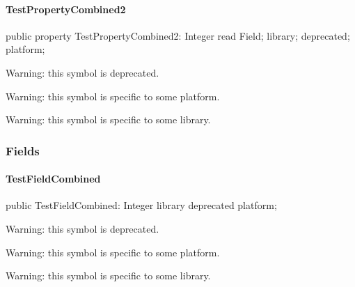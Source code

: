\documentclass{report}
\begin{document}
\paragraph*{TestPropertyCombined2}\hspace*{\fill}

\begin{list}{}{
\setlength{\itemindent}{0cm}
\setlength{\listparindent}{0cm}
\setlength{\leftmargin}{\evensidemargin}
\addtolength{\leftmargin}{\tmplength}
\settowidth{\labelsep}{X}
\addtolength{\leftmargin}{\labelsep}
\setlength{\labelwidth}{\tmplength}
}
\begin{flushleft}
\item[\textbf{Declaration}\hfill]
\begin{ttfamily}
public property TestPropertyCombined2: Integer read Field; library; deprecated; platform;\end{ttfamily}


\end{flushleft}
\par
\item[\textbf{Description}]
Warning: this symbol is deprecated.

Warning: this symbol is specific to some platform.

Warning: this symbol is specific to some library.

 

\end{list}
\subsubsection*{\large{\textbf{Fields}}\normalsize\hspace{1ex}\hfill}
\paragraph*{TestFieldCombined}\hspace*{\fill}

\begin{list}{}{
\setlength{\itemindent}{0cm}
\setlength{\listparindent}{0cm}
\setlength{\leftmargin}{\evensidemargin}
\addtolength{\leftmargin}{\tmplength}
\settowidth{\labelsep}{X}
\addtolength{\leftmargin}{\labelsep}
\setlength{\labelwidth}{\tmplength}
}
\begin{flushleft}
\item[\textbf{Declaration}\hfill]
\begin{ttfamily}
public TestFieldCombined: Integer library deprecated platform;\end{ttfamily}


\end{flushleft}
\par
\item[\textbf{Description}]
Warning: this symbol is deprecated.

Warning: this symbol is specific to some platform.

Warning: this symbol is specific to some library.

 

\end{list}
\end{document}
